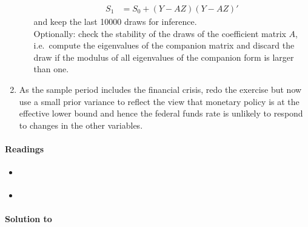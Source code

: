 \begin{enumerate}
\begin{itemize}
\begin{align*}
S_1 &= S_0 + (Y - AZ)(Y - AZ)'
\end{align*}
and keep the last 10000 draws for inference.
\\
Optionally: check the stability of the draws of the coefficient matrix \(A\),
  i.e.\ compute the eigenvalues of the companion matrix and discard the draw
  if the modulus of all eigenvalues of the companion form is larger than one.
\end{itemize}
\item As the sample period includes the financial crisis,
  redo the exercise but now use a small prior variance to reflect the view that monetary policy is at the effective lower bound
  and hence the federal funds rate is unlikely to respond to changes in the other variables.
\end{enumerate}

\paragraph{Readings}
\begin{itemize}
	\item \textcite[Ch.~5]{Kilian.Lutkepohl_2017_StructuralVectorAutoregressive}
	\item \textcite[Ch.~1-2]{Koop.Korobilis_2010_BayesianMultivariateTime}
\end{itemize}

\begin{solution}\textbf{Solution to }
\ifDisplaySolutions

\fi
\newpage
\end{solution}